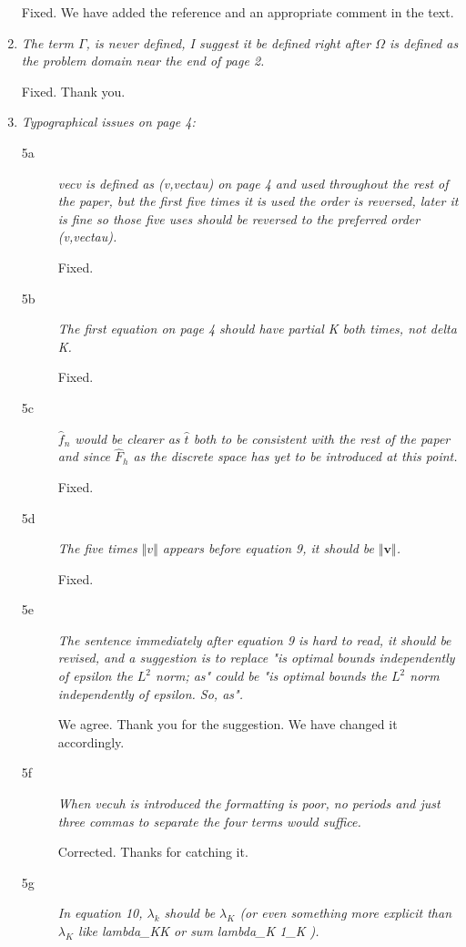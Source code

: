 \documentclass[11pt,c]{article}
\begin{document}
\begin{enumerate}
Fixed. We have added the reference and an appropriate comment in the text.

  \item {\em The term $\Gamma$, is never defined, I suggest it be defined  right after $\Omega$ is defined as the problem domain near the end of page 2.}

Fixed. Thank you.

  \item {\em Typographical issues on page 4:}
\begin{description}
  \item[5a] {\em vec{v} is defined as (v,vec{tau}) on page 4 and used throughout the rest of the paper, but the first five times it is used the order is reversed, later it is fine so those five uses should be reversed to the preferred order (v,vec{tau}).} 

Fixed. 

  \item[5b] {\em  The first equation on page 4 should have partial K both times, not delta K.}

Fixed.

  \item [5c] {\em $\hat f_n$ would be clearer as $\hat t$ both to be consistent with the rest of the paper and since $\hat F_h$ as the discrete space has yet to be introduced at this point.}

Fixed.

  \item [5d] {\em The five times $\Vert v\Vert$ appears before equation 9, it should be $\Vert\mathbf{v}\Vert$.}

Fixed.

  \item[5e] {\em  The sentence immediately after equation 9 is hard to read, it should be revised, and a suggestion is to replace "is optimal bounds independently of epsilon the $L^2$ norm; as" could be "is optimal bounds the 
$L^2$ norm independently of epsilon.  So, as".}

We agree. Thank you for the suggestion. We have changed it accordingly.

  \item[5f] {\em  When vec{uh} is introduced the formatting is poor, no periods and just three commas to separate the four terms would suffice.}

Corrected. Thanks for catching it.

  \item[5g] {\em In equation 10, $\lambda_k$ should be $\lambda_K$ (or even something more explicit than 
$\lambda_K$ like {lambda\_K}K or sum lambda\_K 1\_K ).}


\end{description}
\end{enumerate}
\end{document}
